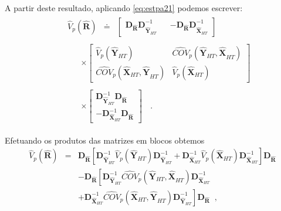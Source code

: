 \documentclass[
  12pt,
  brazilian,
]{book}
\theoremstyle{definition}
\theoremstyle{definition}
\theoremstyle{definition}
\theoremstyle{definition}
\theoremstyle{remark}
\begin{document}
A partir deste resultado, aplicando \eqref{eq:estpa21} podemos escrever:
\begin{eqnarray*}
&& 
\begin{array}{lll}
\widehat{V}_{p}\left( \widehat{\mathbf{R}}\right) & \doteq & \left[ 
\begin{array}{lll}
\mathbf{\mathbf{D}_{\widehat{\mathbf{R}}}D}_{\mathbf{\hat{Y}}_{HT}}^{-1} & 
\left. {}\right. & \mathbf{-\mathbf{D}_{\widehat{\mathbf{R}}}D}_{\mathbf{\hat{X}}_{HT }}^{-1}
\end{array}
\right]
\end{array}
\\
&& 
\begin{array}{lll}
&  & \times \left[ 
\begin{array}{cc}
\widehat{V}_{p}\left( \mathbf{\hat{Y}}_{HT }\right) & \widehat{COV}_{p}\left( \mathbf{\hat{Y}}_{HT }\mathbf{,\hat{X}}_{HT }\right) \\ 
\widehat{COV}_{p}\left( \mathbf{\hat{X}}_{HT }\mathbf{,\hat{Y}}_{HT
}\right) & \widehat{V}_{p}\left( \mathbf{\hat{X}}_{HT }\right)
\end{array}
\right]
\end{array}
\\
&& 
\begin{array}{lll}
&  & \times \left[ 
\begin{array}{l}
\mathbf{D}_{\mathbf{\hat{Y}}_{HT }}^{-1}\mathbf{\mathbf{D}_{\widehat{
\mathbf{R}}}} \\ 
-\mathbf{D}_{\mathbf{\hat{X}}_{HT }}^{-1}\mathbf{\mathbf{D}_{\widehat{
\mathbf{R}}}}
\end{array}
\right]
\end{array}
\;\;.
\end{eqnarray*}

Efetuando os produtos das matrizes em blocos obtemos
\begin{eqnarray}
\widehat{V}_{p}\left( \widehat{\mathbf{R}}\right) &=&\mathbf{\mathbf{D}_{
\widehat{\mathbf{R}}}}\left[ \mathbf{D}_{\mathbf{\hat{Y}}_{HT }}^{-1}%
\widehat{V}_{p}\left( \mathbf{\hat{Y}}_{HT }\right) \mathbf{D}_{\mathbf{
\hat{Y}}_{HT }}^{-1}+\mathbf{D}_{\mathbf{\hat{X}}_{HT }}^{-1}\widehat{V}
_{p}\left( \mathbf{\hat{X}}_{HT }\right) \mathbf{D}_{\mathbf{\hat{X}}_{HT
}}^{-1}\right] \mathbf{\mathbf{D}_{\widehat{\mathbf{R}}}}  \nonumber \\
&&-\mathbf{\mathbf{D}_{\widehat{\mathbf{R}}}}\left[ \mathbf{D}_{\mathbf{\hat{
Y}}_{HT }}^{-1}\widehat{COV}_{p}\left( \mathbf{\hat{Y}}_{HT }\mathbf{,\hat{
X}}_{HT }\right) \mathbf{D}_{\mathbf{\hat{X}}_{HT }}^{-1}\right.
\label{eq:estpa22} \\
&&+\left. \mathbf{D}_{\mathbf{\hat{X}}_{HT }}^{-1}\widehat{COV}_{p}\left( 
\mathbf{\hat{X}}_{HT }\mathbf{,\hat{Y}}_{HT }\right) \mathbf{D}_{\mathbf{
\hat{Y}}_{HT }}^{-1}\right] \mathbf{\mathbf{D}_{\widehat{\mathbf{R}}}}\;\;
\mbox{,}  \nonumber
\end{eqnarray}
\end{document}

